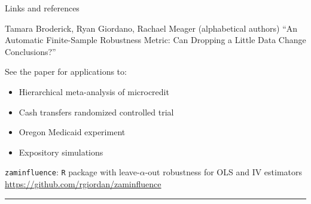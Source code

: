 \begin{frame}{Links and references}

\footnotesize

Tamara Broderick, Ryan Giordano, Rachael Meager (alphabetical authors) \newline
``An Automatic Finite-Sample Robustness Metric: Can Dropping a Little Data Change Conclusions?''

See the paper for applications to:
\vspace{-1em}
\begin{itemize}
    \item[--] Hierarchical meta-analysis of microcredit \parencite{meager2020aggregating} \vspace{-0.5em}
    \item[--] Cash transfers randomized controlled trial \parencite{angelucci2009indirect} \vspace{-0.5em}
    \item[--] Oregon Medicaid experiment \parencite{finkelstein2012oregon} \vspace{-0.5em}
    \item[--] Expository simulations
\end{itemize}


%
%
\texttt{zaminfluence}: \texttt{R} package with leave-$\alpha$-out
robustness for OLS and IV estimators \newline
{\color{blue}\url{https://github.com/rgiordan/zaminfluence}}
\vspace{-0.5em}

\par\noindent\rule{\textwidth}{0.4pt}

\vspace{-0.5em}


\begingroup
\renewcommand{\section}[2]{}%
{
\tiny

}
\endgroup

\end{frame}
